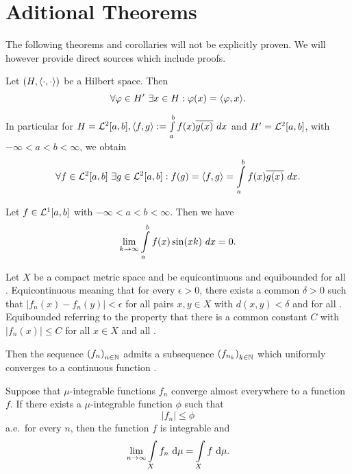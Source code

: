 \appendix
\chapter{Aditional Theorems}

The following theorems and corollaries will not be explicitly proven. We will however provide direct sources which include proofs.

\begin{theorem}\label{Rie-Fre}
	Let $(H, \inner{\cdot}{\cdot})$ be a Hilbert space. Then
	\[ \forall \varphi \in H'~\exists x \in H: \varphi(x) = \inner{\varphi}{x}. \]
\end{theorem}

\begin{corollary}
	In particular for $H = \ELL{2}[a, b], \inner{f}{g} := \int\limits_a^b f(x) \conj{g(x)}~dx$ and $H' = \ELL{2}[a,b]$, with $-\infty < a < b < \infty$, we obtain
	\[ \forall f \in \ELL{2}[a,b]~\exists g \in \ELL{2}[a,b]: f(g) = \inner{f}{g} = \int\limits_a^b f(x) \conj{g(x)}~dx. \]
\end{corollary}

\begin{theorem}\label{Rie-Leb}
	Let $f \in \ELL{1}[a,b]$ with $-\infty < a < b < \infty$. Then we have
	\[ \lim\limits_{\Ninf[k]} \int\limits_a^b f(x)\sin(xk)~dx = 0. \]
\end{theorem}

\begin{theorem}\label{Arz-Asc}
	Let $X$ be a compact metric space and  be equicontinuous and equibounded for all \NinN. Equicontinuous meaning that for every $\epsilon > 0$, there exists a common $\delta > 0$ such that $|f_n(x) - f_n(y)| < \epsilon$ for all pairs $x, y \in X$ with $d(x, y) < \delta$ and for all \NinN. Equibounded referring to the property that there is a common constant $C$ with $|f_n(x)| \le C$ for all $x \in X$ and all \NinN.

	Then the sequence ${(f_n)}_{\NinN}$ admits a subsequence ${(f_{n_k})}_{\NinN[k]}$ which uniformly converges to a continuous function .
\end{theorem}

\begin{theorem}\label{Leb-DomCon}
	Suppose that $\mu$-integrable functions $f_n$ converge almost everywhere to a function $f$. If there exists a $\mu$-integrable function $\phi$ such that
	\[ |f_n| \le \phi \]
	a.e.~for every $n$, then the function $f$ is integrable and
	\[ \lim\limits_{\Ninf} \int\limits_X f_n~\D = \int\limits_X f~\D. \]
\end{theorem}
